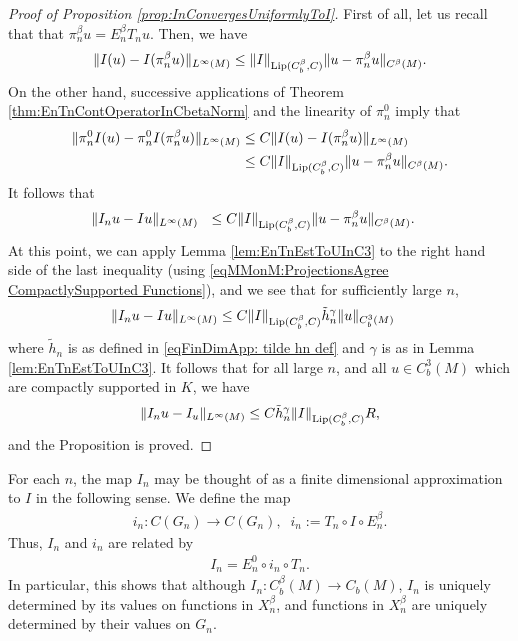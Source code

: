 \documentclass[11pt,reqno]{amsart}
\numberwithin{equation}{section}
\theoremstyle{plain}
\def\gam{\gamma}
\newcommand{\norm}[1]{\lVert#1\rVert}
\begin{document}
\begin{proof}[Proof of Proposition  \ref{prop:InConvergesUniformlyToI}]
  First of all, let us recall that that $\pi_n^\beta u = E_n^\beta T_n u$.  Then, we have
  \begin{align*}  
    \|I(u)-I(\pi_n^\beta u)\|_{L^\infty(M)} \leq \norm{I}_{\textnormal{Lip}(C^{\beta}_b,C)}\|u-\pi_n^\beta u\|_{C^\beta(M)}.
  \end{align*}
  On the other hand, successive applications of Theorem \ref{thm:EnTnContOperatorInCbetaNorm} and the linearity of $\pi_n^0$ imply that
  \begin{align*}
    \|\pi_n^0I(u)-\pi_n^0 I(\pi_n^\beta u)\|_{L^\infty(M)} & \leq C\|I(u)-I(\pi_n^\beta u)\|_{L^\infty(M)}\\
	& \leq C\norm{I}_{\textnormal{Lip}(C^{\beta}_b,C)}\|u-\pi_n^\beta u\|_{C^\beta(M)}.
  \end{align*}	
  It follows that
  \begin{align*}
    &\norm{I_nu - Iu}_{L^\infty(M)} \ \ \leq  C\norm{I}_{\textnormal{Lip}(C^{\beta}_b,C)}\|u-\pi_n^\beta u\|_{C^\beta(M)}.
  \end{align*}
  At this point, we can apply Lemma \ref{lem:EnTnEstToUInC3} to the right hand side of the last inequality (using \eqref{eqMMonM:ProjectionsAgree CompactlySupported Functions}), and we see that for sufficiently large $n$,
	\begin{align*}
		&\norm{I_nu - Iu}_{L^\infty(M)} \leq C\norm{I}_{\textnormal{Lip}(C^{\beta}_b,C)}\tilde h_n^\gam\norm{u}_{C^3_b(M)}
	\end{align*}
	where $\tilde h_n$ is as defined in \eqref{eqFinDimApp: tilde hn def} and $\gamma$ is as in Lemma \ref{lem:EnTnEstToUInC3}.  It follows that for all large $n$, and all $u\in C^3_b(M)$ which are compactly supported in $K$, we have
	\begin{align*}
	  \|I_nu-I_u\|_{L^\infty(M)} \leq C\tilde h_n^\gamma \norm{I}_{\textnormal{Lip}(C^{\beta}_b,C)}R,
        \end{align*}		
        and the Proposition is proved.		
\end{proof}

For each $n$, the map $I_n$ may be thought of as a finite dimensional approximation to $I$ in the following sense. We define the map
\begin{align}\label{eqMMonM:LittleInDef}
  i_n : C(G_n) \to C(G_n),\;\;i_n := T_n \circ I \circ E^\beta_n.
\end{align}	
Thus, $I_n$ and $i_n$ are related by
\begin{align*}
  I_n = E_n^{0} \circ i_n \circ T_n.
\end{align*}
In particular, this shows that although $I_n:C^\beta_b(M)\to C_b(M)$, $I_n$ is uniquely determined by its values on functions in $X_n^\beta$, and functions in $X_n^\beta$ are uniquely determined by their values on $G_n$.
\end{document}
